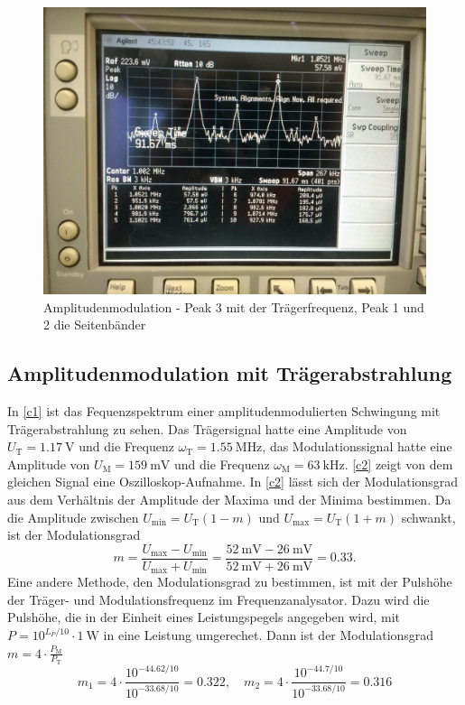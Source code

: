 \begin{figure}
	\centering
	\includegraphics[width=\textwidth]{img/Aufgabenteil_b.jpg}
	\caption{Amplitudenmodulation - Peak 3 mit der Trägerfrequenz, Peak 1 und 2 die Seitenbänder}
	\label{b}
\end{figure}

\subsection{Amplitudenmodulation mit Trägerabstrahlung}

In \autoref{c1} ist das Fequenzspektrum einer amplitudenmodulierten Schwingung mit Trägerabstrahlung zu sehen. Das Trägersignal hatte eine Amplitude von $U_\text{T}=\SI{1.17}{\volt}$ und die Frequenz $\omega_\text{T}=\SI{1.55}{\mega\hertz}$, das Modulationssignal hatte eine Amplitude von $U_\text{M}=\SI{159}{\milli\volt}$ und die Frequenz $\omega_\text{M}=\SI{63}{\kilo\hertz}$. \autoref{c2} zeigt von dem gleichen Signal eine Oszilloskop-Aufnahme. In \autoref{c2} lässt sich der Modulationsgrad aus dem Verhältnis der Amplitude der Maxima und der Minima bestimmen. Da die Amplitude zwischen $U_\text{min} = U_\text{T}(1 - m)$ und $U_\text{max} = U_\text{T}(1 + m)$ schwankt, ist der Modulationsgrad
\[
	m =\frac{U_\text{max} - U_\text{min}}{U_\text{max} + U_\text{min}} = \frac{\SI{52}{\milli\volt} - \SI{26}{\milli\volt}}{\SI{52}{\milli\volt} + \SI{26}{\milli\volt}} = 0.33.
\]
Eine andere Methode, den Modulationsgrad zu bestimmen, ist mit der Pulshöhe der Träger- und Modulationsfrequenz im Frequenzanalysator. Dazu wird die Pulshöhe, die in der Einheit eines Leistungspegels angegeben wird, mit $P = 10^{L_P/10} \cdot \SI{1}{\watt}$ in eine Leistung umgerechet. Dann ist der Modulationsgrad $m = 4 \cdot \frac{P_\text{M}}{P_\text{T}}$
\[
	m_1 = 4 \cdot \frac{10^{-44.62/10}}{10^{-33.68/10}} = 0.322, \quad m_2 = 4 \cdot \frac{10^{-44.7/10}}{10^{-33.68/10}} = 0.316
\]

